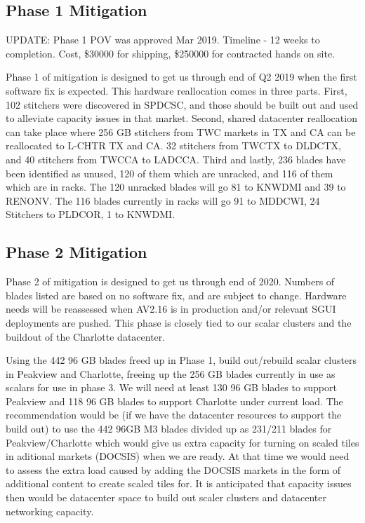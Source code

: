 \documentclass{article}
\begin{document}
\subsection{Phase 1 Mitigation}
\label{SECTION-Phase1}

UPDATE: Phase 1 POV was approved Mar 2019. Timeline - 12 weeks to completion. Cost, \$30000 for shipping, \$250000 for contracted hands on site. 

Phase 1 of mitigation is designed to get us through end of Q2 2019 when the first software fix is expected. This hardware reallocation comes in three parts. First, 102 stitchers were discovered in SPDCSC, and those should be built out and used to alleviate capacity issues in that market. Second, shared datacenter reallocation can take place where 256 GB stitchers from TWC markets in TX and CA can be reallocated to L-CHTR TX and CA. 32 stitchers from TWCTX to DLDCTX, and 40 stitchers from TWCCA to LADCCA. Third and lastly, 236 blades have been identified as unused, 120 of them which are unracked, and 116 of them which are in racks. The 120 unracked blades will go 81 to KNWDMI and 39 to RENONV. The 116 blades currently in racks will go 91 to MDDCWI, 24 Stitchers to PLDCOR, 1 to KNWDMI. 

\subsection{Phase 2 Mitigation}
\label{SECTION-Phase2}

Phase 2 of mitigation is designed to get us through end of 2020. Numbers of blades listed are based on no software fix, and are subject to change. Hardware needs will be reassessed when AV2.16 is in production and/or relevant SGUI deployments are pushed. This phase is closely tied to our scalar clusters and the buildout of the Charlotte datacenter. 

Using the 442 96 GB blades freed up in Phase 1, build out/rebuild scalar clusters in Peakview and Charlotte, freeing up the 256 GB blades currently in use as scalars for use in phase 3. We will need at least 130 96 GB blades to support Peakview and 118 96 GB blades to support Charlotte under current load. The recommendation would be (if we have the datacenter resources to support the build out) to use the 442 96GB M3 blades divided up as 231/211 blades for Peakview/Charlotte which would give us extra capacity for turning on scaled tiles in aditional markets (DOCSIS) when we are ready. At that time we would need to assess the extra load caused by adding the DOCSIS markets in the form of additional content to create scaled tiles for. It is anticipated that capacity issues then would be datacenter space to build out scaler clusters and datacenter networking capacity. 
\end{document}
